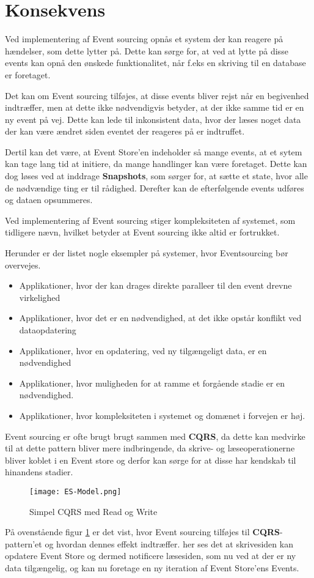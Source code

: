 \section{Konsekvens}
Ved implementering af Event sourcing opnås et system der kan reagere på hændelser, som dette lytter på. Dette kan sørge for, at ved at lytte på disse events kan opnå den ønskede funktionalitet, når f.eks en skriving til en database er foretaget.

Det kan om Event sourcing tilføjes, at disse events bliver rejst når en begivenhed indtræffer, men at dette ikke nødvendigvis betyder, at der ikke samme tid er en ny event på vej. Dette kan lede til inkonsistent data, hvor der læses noget data der kan være ændret siden eventet der reageres på er indtruffet.

Dertil kan det være, at Event Store'en indeholder så mange events, at et sytem kan tage lang tid at initiere, da mange handlinger kan være foretaget. Dette kan dog løses ved at inddrage \textbf{Snapshots}, som sørger for, at sætte et state, hvor alle de nødvændige ting er til rådighed. Derefter kan de efterfølgende events udføres og dataen opsummeres.

Ved implementering af Event sourcing stiger kompleksiteten af systemet, som tidligere nævn, hvilket betyder at Event sourcing ikke altid er fortrukket. 

Herunder er der listet nogle eksempler på systemer, hvor Eventsourcing bør overvejes.
\begin{itemize}
	\item Applikationer, hvor der kan drages direkte paralleer til den event drevne virkelighed
	\item Applikationer, hvor det er en nødvendighed, at det ikke opstår konflikt ved dataopdatering 
	\item Applikationer, hvor en opdatering, ved ny tilgængeligt data, er en nødvendighed
	\item Applikationer, hvor muligheden for at ramme et forgående stadie er en nødvendighed.
	\item Applikationer, hvor kompleksiteten i systemet og domænet i forvejen er høj.
\end{itemize}

Event sourcing er ofte brugt brugt sammen med \textbf{CQRS}, da dette kan medvirke til at dette pattern bliver mere indbringende, da skrive- og læseoperationerne bliver koblet i en Event store og derfor kan sørge for at disse har kendskab til hinandens stadier.

\begin{figure}[H]
	\center
	\texttt{[image: ES-Model.png]}
	\caption{Simpel CQRS med Read og Write}
	\label{fig:cqrs-ES_model}
\end{figure}

På ovenstående figur \ref{fig:cqrs-ES_model} er det vist, hvor Event sourcing tilføjes til \textbf{CQRS}-pattern'et og hvordan dennes effekt indtræffer. her ses det at skrivesiden kan opdatere Event Store og dermed notificere læsesiden, som nu ved at der er ny data tilgængelig, og kan nu foretage en ny iteration af Event Store'ens Events.